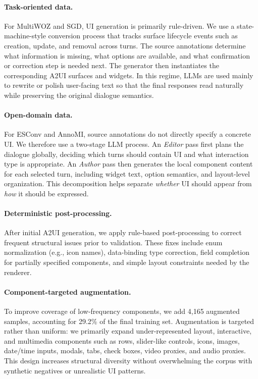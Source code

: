 \documentclass{llmxive}
\begin{document}
\paragraph{Task-oriented data.}
For MultiWOZ and SGD, UI generation is primarily rule-driven. We use a state-machine-style conversion process that tracks surface lifecycle events such as creation, update, and removal across turns. The source annotations determine what information is missing, what options are available, and what confirmation or correction step is needed next. The generator then instantiates the corresponding A2UI surfaces and widgets. In this regime, LLMs are used mainly to rewrite or polish user-facing text so that the final responses read naturally while preserving the original dialogue semantics.

\paragraph{Open-domain data.}
For ESConv and AnnoMI, source annotations do not directly specify a concrete UI. We therefore use a two-stage LLM process. An \emph{Editor} pass first plans the dialogue globally, deciding which turns should contain UI and what interaction type is appropriate. An \emph{Author} pass then generates the local component content for each selected turn, including widget text, option semantics, and layout-level organization. This decomposition helps separate \emph{whether} UI should appear from \emph{how} it should be expressed.

\paragraph{Deterministic post-processing.}
After initial A2UI generation, we apply rule-based post-processing to correct frequent structural issues prior to validation. These fixes include enum normalization (e.g., icon names), data-binding type correction, field completion for partially specified components, and simple layout constraints needed by the renderer.

\paragraph{Component-targeted augmentation.}
To improve coverage of low-frequency components, we add 4{,}165 augmented samples, accounting for 29.2\% of the final training set. Augmentation is targeted rather than uniform: we primarily expand under-represented layout, interactive, and multimedia components such as rows, slider-like controls, icons, images, date/time inputs, modals, tabs, check boxes, video proxies, and audio proxies. This design increases structural diversity without overwhelming the corpus with synthetic negatives or unrealistic UI patterns.
\end{document}

